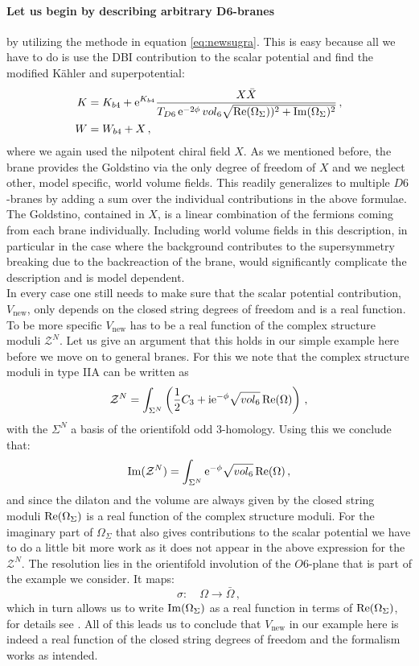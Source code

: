 \documentclass[a4paper,12pt]{report}
\newcommand{\be}{\begin{equation}}
\newcommand{\ee}{\end{equation}}
\newcommand{\bea}{\begin{equation}\begin{aligned}}
\newcommand{\eea}{\end{aligned}\end{equation}}
\def\rmi{{\rm i}}
\def\rme{{\rm e}}
\def\rmre{{\rm Re}}
\def\rmim{{\rm Im}}
\begin{document}
\paragraph{Let us begin by describing arbitrary $\mathbf{D6}$-branes} by utilizing the methode in equation \eqref{eq:newsugra}. This is easy because all we have to do is use the DBI contribution to the scalar potential and find the modified Kähler and superpotential:
\bea 
K &= K_{b4} + \rme^{K_{b4}} \frac{X\bar{X}}{T_{D6} \, \rme^{-2\phi} \, vol_6 \sqrt{\rmre (\Omega_\Sigma))^2 + \rmim (\Omega_\Sigma)^2}}\,,\\
W &= W_{b4} + X\,,
\eea
where we again used the nilpotent chiral field $X$. As we mentioned before, the brane provides the Goldstino via the only degree of freedom of $X$ and we neglect other, model specific, world volume fields. This readily generalizes to multiple $D6$-branes by adding a sum over the individual contributions in the above formulae. The Goldstino, contained in $X$, is a linear combination of the fermions coming from each brane individually. Including world volume fields in this description, in particular in the case where the background contributes to the supersymmetry breaking due to the backreaction of the brane, would significantly complicate the description and is model dependent.\\
In every case one still needs to make sure that the scalar potential contribution, $V_{\text{new}}$, only depends on the closed string degrees of freedom and is a real function. To be more specific $V_{\text{new}}$ has to be a real function of the complex structure moduli $\mathcal{Z}^N$. Let us give an argument that this holds in our simple example here before we move on to general branes. For this we note that the complex structure moduli in type IIA can be written as
\be 
\mathcal{Z}^N = \int_{\Sigma^N} \left(\frac{1}{2} C_3 + \rmi \rme^{-\phi} \sqrt{vol_6}\,\rmre(\Omega)\right)\,,
\ee
with the $\Sigma^N$ a basis of the orientifold odd 3-homology. Using this we conclude that:
\be 
\rmim(\mathcal{Z}^N) = \int_{\Sigma^N} \rme^{-\phi} \sqrt{vol_6} \, \rmre(\Omega)\,,
\ee
and since the dilaton and the volume are always given by the closed string moduli $\rmre(\Omega_\Sigma)$ is a real function of the complex structure moduli. For the imaginary part of $\Omega_\Sigma$ that also gives contributions to the scalar potential we have to do a little bit more work as it does not appear in the above expression for the $\mathcal{Z}^N$. The resolution lies in the orientifold involution of the $O6$-plane that is part of the example we consider. It maps:
\be 
\sigma:\quad \Omega \to \bar{\Omega}\,,
\ee
which in turn allows us to write $\rmim(\Omega_\Sigma)$ as a real function in terms of $\rmre(\Omega_\Sigma)$, for details see \cite{Grimm:2004ua}. All of this leads us to conclude that $V_{\text{new}}$ in our example here is indeed a real function of the closed string degrees of freedom and the formalism works as intended.
\end{document}
